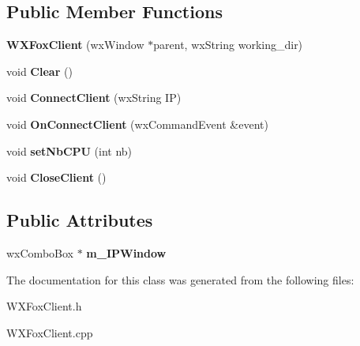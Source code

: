 \subsection*{Public Member Functions}
\begin{DoxyCompactItemize}
\item 
\mbox{\label{class_w_x_fox_client_ae17ab607715122b3ada643140a9ff5d4}} 
{\bfseries W\+X\+Fox\+Client} (wx\+Window $\ast$parent, wx\+String working\+\_\+dir)
\item 
\mbox{\label{class_w_x_fox_client_a4716281332fdb6e085b762ba64487350}} 
void {\bfseries Clear} ()
\item 
\mbox{\label{class_w_x_fox_client_a373a39e74d34b299c79f11571e2802c3}} 
void {\bfseries Connect\+Client} (wx\+String IP)
\item 
\mbox{\label{class_w_x_fox_client_a11baccaa5a775162cf675de79fc5e523}} 
void {\bfseries On\+Connect\+Client} (wx\+Command\+Event \&event)
\item 
\mbox{\label{class_w_x_fox_client_a1387259408968a09abfc65c9698dbea9}} 
void {\bfseries set\+Nb\+C\+PU} (int nb)
\item 
\mbox{\label{class_w_x_fox_client_a2a7c0166dc008fd7af9d2a3fd2ddd123}} 
void {\bfseries Close\+Client} ()
\end{DoxyCompactItemize}
\subsection*{Public Attributes}
\begin{DoxyCompactItemize}
\item 
\mbox{\label{class_w_x_fox_client_a804ca66cc1107dbf9ff175ca9e6e0317}} 
wx\+Combo\+Box $\ast$ {\bfseries m\+\_\+\+I\+P\+Window}
\end{DoxyCompactItemize}


The documentation for this class was generated from the following files\+:\begin{DoxyCompactItemize}
\item 
W\+X\+Fox\+Client.\+h\item 
W\+X\+Fox\+Client.\+cpp\end{DoxyCompactItemize}
